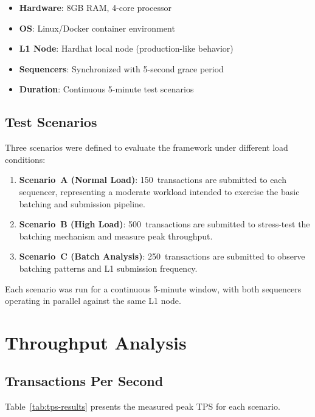 \documentclass[
]{elteikthesis}[2024/04/26]
\begin{document}
\begin{itemize}
    \item \textbf{Hardware}: 8GB RAM, 4-core processor
    \item \textbf{OS}: Linux/Docker container environment
    \item \textbf{L1 Node}: Hardhat local node (production-like behavior)
    \item \textbf{Sequencers}: Synchronized with 5-second grace period
    \item \textbf{Duration}: Continuous 5-minute test scenarios
\end{itemize}

\subsection{Test Scenarios}

Three scenarios were defined to evaluate the framework under different load conditions:

\begin{enumerate}
    \item \textbf{Scenario~A (Normal Load)}: 150~transactions are submitted to each sequencer, representing a moderate workload intended to exercise the basic batching and submission pipeline.
    \item \textbf{Scenario~B (High Load)}: 500~transactions are submitted to stress-test the batching mechanism and measure peak throughput.
    \item \textbf{Scenario~C (Batch Analysis)}: 250~transactions are submitted to observe batching patterns and L1 submission frequency.
\end{enumerate}

Each scenario was run for a continuous 5-minute window, with both sequencers operating in parallel against the same L1 node.

\section{Throughput Analysis}

\subsection{Transactions Per Second}

Table~\ref{tab:tps-results} presents the measured peak TPS for each scenario.
\end{document}
